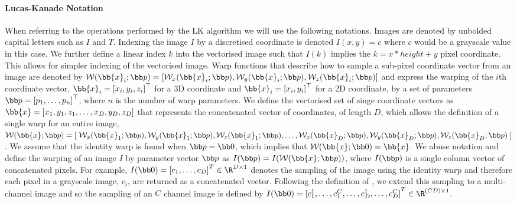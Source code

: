 \paragraph{Lucas-Kanade Notation}\label{subsubsec:lk-notation}
When referring to the operations performed by the LK algorithm we will use the
following notations. Images are denoted by unbolded capital letters such as
$I$ and $T$. Indexing the image $I$ by a discretised coordinate is
denoted $I(x, y) = c$ where $c$ would be a grayscale value in this case. We
further define a linear index $k$ into the vectorised image such that $I(k)$
implies the $k = x * height + y$ pixel coordinate.
This allows for simpler indexing of the vectorised image.
Warp functions that describe how to sample a sub-pixel coordinate
vector from an image are denoted by
$\mathcal{W}(\bb{x}_i;\p) = \left[\mathcal{W}_x(\bb{x}_i;\p), \mathcal{W}_y(\bb{x}_i;\p),\mathcal{W}_z(\bb{x}_i;\p) \right]$
and express the warping of the $i$th coordinate vector,
$\bb{x}_i = {[x_i, y_i, z_i]}^{\top}$ for a 3D coordinate and
$\bb{x}_i = {[x_i, y_i]}^{\top}$ for a 2D coordinate, by a set of parameters
$\p = {\left[p_1, \ldots, p_n\right]}^{\top}$, where $n$ is the number of warp
parameters. We define the vectorised set of singe coordinate vectors as
$\bb{x} = \left[ x_1, y_1, z_1, \ldots, x_D, y_D, z_D \right]$ that
represents the concatenated vector of coordinates, of length $D$, which allows
the definition of a single warp for an entire image,
$\mathcal{W}(\bb{x};\p) = \left[\right. \mathcal{W}_x(\bb{x}_1;\p), \mathcal{W}_y(\bb{x}_1;\p), \mathcal{W}_z(\bb{x}_1;\p),\ldots,\mathcal{W}_x(\bb{x}_D;\p), \mathcal{W}_y(\bb{x}_D;\p), \mathcal{W}_z(\bb{x}_D;\p) \left.\right]$.
We assume that the identity warp is found when $\p = \zero$, which implies that
$\mathcal{W}(\bb{x};\zero) = \bb{x}$. We abuse notation and define the
warping of an image $I$ by parameter vector $\p$ as $I(\p) = I(\mathcal{W}(\bb{x};\p))$,
where $I(\p)$ is a single column vector of concatenated pixels. For example,
$I(\zero) = {[c_1, \ldots, c_D]}^T \in \R^{D \times 1}$ denotes the
sampling of the image using the
identity warp and therefore each pixel in a grayscale image, $c_i$, are returned
as a concatenated vector. Following the definition of
\citet{antonakos2015feature}, we extend this sampling to a multi-channel image
and so the sampling of an $C$ channel image is defined by
$I(\zero) = {[c^1_1, \ldots, c^C_1, \ldots, c^1_D, \ldots, c^C_D]}^T \in \R^{(CD) \times 1}$.
